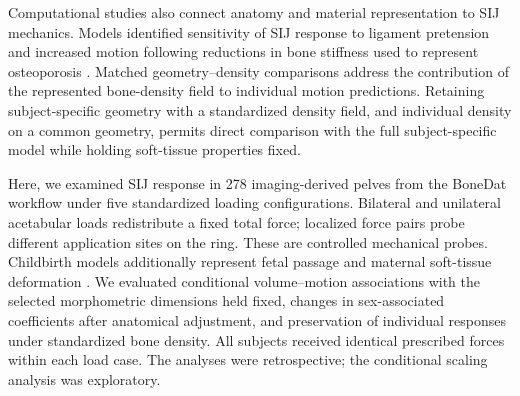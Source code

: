 Computational studies also connect anatomy and material representation to SIJ mechanics. Models identified sensitivity of SIJ response to ligament pretension \citep{Heyland2025} and increased motion following reductions in bone stiffness used to represent osteoporosis \citep{Fan2026}. Matched geometry--density comparisons address the contribution of the represented bone-density field to individual motion predictions. Retaining subject-specific geometry with a standardized density field, and individual density on a common geometry, permits direct comparison with the full subject-specific model while holding soft-tissue properties fixed.

Here, we examined SIJ response in 278 imaging-derived pelves from the BoneDat workflow \citep{HenyssKuchar2025BoneDat} under five standardized loading configurations. Bilateral and unilateral acetabular loads redistribute a fixed total force; localized force pairs probe different application sites on the ring. These are controlled mechanical probes. Childbirth models additionally represent fetal passage and maternal soft-tissue deformation \citep{ChenGrimm2021}. We evaluated conditional volume--motion associations with the selected morphometric dimensions held fixed, changes in sex-associated coefficients after anatomical adjustment, and preservation of individual responses under standardized bone density. All subjects received identical prescribed forces within each load case. The analyses were retrospective; the conditional scaling analysis was exploratory.
